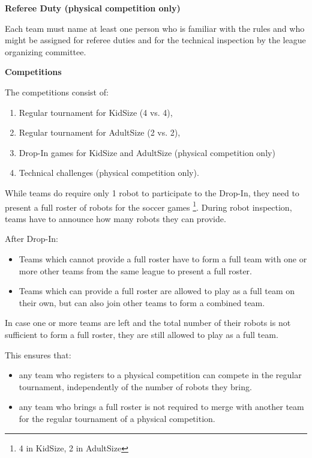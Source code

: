 \bigskip

{\bfseries Referee Duty (physical competition only)}

\headlinebox

Each team must name at least one person who is familiar with the rules and who
might be assigned for referee duties and for the technical inspection by the
league organizing committee.

\bigskip

{\bfseries Competitions}

\headlinebox

The competitions consist of:

\begin{enumerate}
\item Regular tournament for KidSize (4 vs. 4),
\item Regular tournament for AdultSize (2 vs. 2),
\item Drop-In games for KidSize and AdultSize (physical competition only)
\item Technical challenges (physical competition only).
\end{enumerate}

\bigskip

  While teams do require only 1 robot to participate to the Drop-In,
  they need to present a full roster of robots for the soccer games%
  \footnote{4 in KidSize, 2 in AdultSize}.
  During robot inspection, teams have to announce how many robots they can provide.

  After Drop-In:
  \begin{itemize}
  \item Teams which cannot provide a full roster have to form a
    full team with one or more other teams from the same league to present
    a full roster.
  \item Teams which can provide a full roster are allowed to play as a
    full team on their own,
    but can also join other teams to form a combined team.
  \end{itemize}
  
  In case one or more teams are left and the total number of their robots is
  not sufficient to form a full roster,
  they are still allowed to play as a full team.
  
  This ensures that:
  \begin{itemize}
  \item any team who registers to a physical competition can compete in the regular tournament,
    independently of the number of robots they bring.
  \item any team who brings a full roster is not required to merge with another
    team for the regular tournament of a physical competition.
  \end{itemize}


